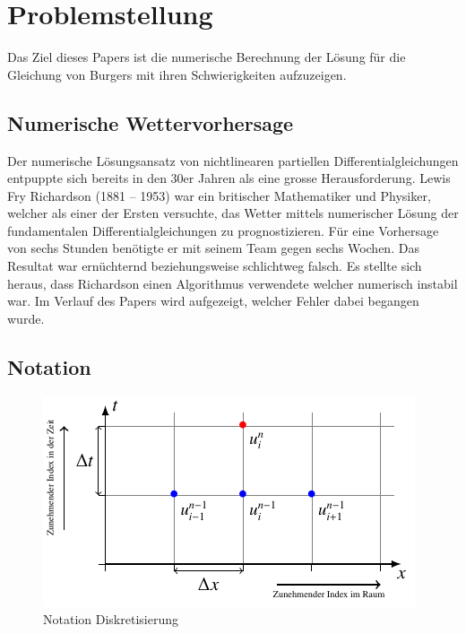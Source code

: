 %
%
\section{Problemstellung
\label{burgers:section:problemstellung}}

	Das Ziel dieses Papers ist die numerische Berechnung der Lösung für die Gleichung von Burgers mit ihren Schwierigkeiten aufzuzeigen.



	\subsection{Numerische Wettervorhersage}
	\label{burgers:sec:nwp}

	Der numerische L\"osungsansatz von nichtlinearen partiellen Differentialgleichungen entpuppte sich bereits in den 30er Jahren als eine grosse Herausforderung.
	Lewis Fry Richardson (1881 -- 1953) war ein britischer Mathematiker und Physiker, welcher als einer der Ersten versuchte, das Wetter mittels numerischer Lösung der fundamentalen Differentialgleichungen zu prognostizieren.
	F\"ur eine Vorhersage von sechs Stunden ben\"otigte er mit seinem Team gegen sechs Wochen.
	Das Resultat war ern\"uchternd beziehungsweise schlichtweg falsch.
	Es stellte sich heraus, dass Richardson einen Algorithmus verwendete welcher numerisch instabil war.
	Im Verlauf des Papers wird aufgezeigt, welcher Fehler dabei begangen wurde.

	\subsection{Notation}

     \begin{figure}
       \centering
       \includegraphics[width=.8\textwidth]{papers/burgers/BurgersEquation/tikz/Gitter/gitter.pdf}
       \caption{Notation Diskretisierung}
       \label{burgers:fig:Disk}
     \end{figure}


